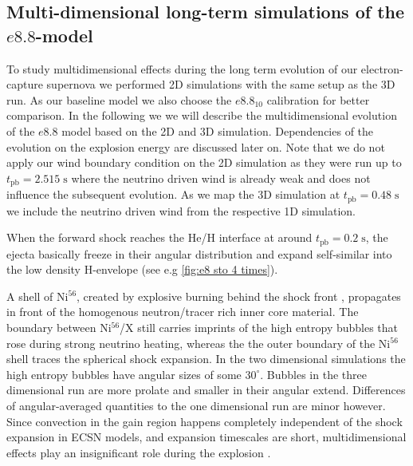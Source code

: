 \documentclass[fleqn,usenatbib]{mnras}
\newcommand{\tpb}{\ensuremath{t_{\text{pb}}}}
\newcommand{\nickel}{$\mathrm{Ni^{56}}$\xspace}
\newcommand{\tracer}{$\mathrm{X}$\xspace}
\renewcommand{\sec}{\xspace\ensuremath{\mathrm{s}}}
\begin{document}
\subsection{Multi-dimensional long-term simulations of the $e8.8$-model}
To study multidimensional effects during the long term evolution of our electron-capture supernova we performed 2D simulations with the same setup as the 3D run. As our baseline model we also choose the $e8.8_{10}$ calibration for better comparison. In the following we we will describe the multidimensional evolution of the $e8.8$ model based on the 2D and 3D simulation. Dependencies of the evolution on the explosion energy are discussed later on.
Note that we do not apply our wind boundary condition on the 2D simulation as they were run up to $\tpb=2.515\;\sec$ where the neutrino driven wind is already weak and does not influence the subsequent evolution. As we map the 3D simulation at $\tpb=0.48\;\sec$ we include the neutrino driven wind from the respective 1D simulation.

When the forward shock reaches the He/H interface at around $\tpb=0.2\;\sec$, the ejecta basically freeze in their angular distribution and expand self-similar into the low density H-envelope (see e.g \autoref{fig:e8 sto 4 times}). 

A shell of \nickel, created by explosive burning behind the shock front \citep{Kifonidis2006}, propagates in front of the homogenous neutron/tracer rich inner core material. The boundary between \nickel/\tracer still carries imprints of the high entropy bubbles that rose during strong neutrino heating, whereas the the outer boundary of the \nickel shell traces the spherical shock expansion. In the two dimensional simulations the high entropy bubbles have angular sizes of some $30^{\circ}$. Bubbles in the three dimensional run are more prolate and smaller in their angular extend. 
Differences of angular-averaged quantities to the one dimensional run are minor however. Since convection in the gain region happens completely independent of the shock expansion in ECSN models, and expansion timescales are short, multidimensional effects play an insignificant role during the explosion  \citep{Janka2008}. 
\end{document}
